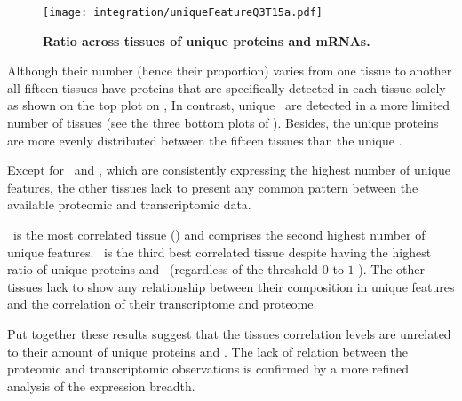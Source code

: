 \begin{figure}[!htb]
    \texttt{[image: integration/uniqueFeatureQ3T15a.pdf]}\centering
    \vspace{-3mm}
    \caption[Ratio across tissues of unique proteins and mRNAs]{\label{fig:UniqueFeatureQ3T15}
    \textbf{Ratio across tissues of unique proteins and mRNAs.}
    }
\end{figure}

Although their number (hence their proportion) varies from one tissue to another
all fifteen tissues have proteins
that are specifically detected in each tissue solely
as shown on the top plot on ,
In contrast, unique \mRNAs\ are detected in a more limited number of tissues
(see the three bottom plots of ).
Besides, the unique proteins are more evenly distributed
between the fifteen tissues than the unique \mRNAs.

Except for \Testis\ and \Liver,
which are consistently expressing the highest number of unique features,
the other tissues lack to present any common pattern
between the available proteomic and transcriptomic data.

\Liver\ is the most correlated tissue ()
and comprises the second highest number of unique features.
\Testis\ is the third best correlated tissue
despite having the highest ratio of unique proteins and \mRNAs\
(regardless of the threshold $0$ to $1$ \FPKM).
The other tissues lack to show any relationship
between their composition in unique features
and the correlation of their transcriptome and proteome.

Put together these results suggest that
the tissues correlation levels are unrelated
to their amount of unique proteins and \mRNAs{}.
The lack of relation between the proteomic and transcriptomic observations
is confirmed by a more refined analysis of the expression breadth.


